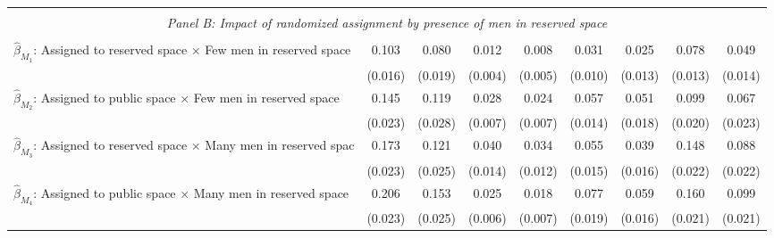 \begin{tabular}{l*{8}{c}}
\hline \\[-1ex] \multicolumn{9}{c}{\textit{Panel B: Impact of randomized assignment by presence of men in reserved space}} \\\\[-1ex]
$\hat\beta_{M_1}$: Assigned to reserved space $\times$ Few men in reserved space&       0.103\sym{***}&       0.080\sym{***}&       0.012\sym{***}&       0.008         &       0.031\sym{***}&       0.025\sym{*}  &       0.078\sym{***}&       0.049\sym{***}\\
                    &     (0.016)         &     (0.019)         &     (0.004)         &     (0.005)         &     (0.010)         &     (0.013)         &     (0.013)         &     (0.014)         \\
[1em]
$\hat\beta_{M_2}$: Assigned to public space $\times$ Few men in reserved space&       0.145\sym{***}&       0.119\sym{***}&       0.028\sym{***}&       0.024\sym{***}&       0.057\sym{***}&       0.051\sym{***}&       0.099\sym{***}&       0.067\sym{***}\\
                    &     (0.023)         &     (0.028)         &     (0.007)         &     (0.007)         &     (0.014)         &     (0.018)         &     (0.020)         &     (0.023)         \\
[1em]
$\hat\beta_{M_3}$: Assigned to reserved space $\times$ Many men in reserved spac&       0.173\sym{***}&       0.121\sym{***}&       0.040\sym{***}&       0.034\sym{***}&       0.055\sym{***}&       0.039\sym{**} &       0.148\sym{***}&       0.088\sym{***}\\
                    &     (0.023)         &     (0.025)         &     (0.014)         &     (0.012)         &     (0.015)         &     (0.016)         &     (0.022)         &     (0.022)         \\
[1em]
$\hat\beta_{M_4}$: Assigned to public space $\times$ Many men in reserved space&       0.206\sym{***}&       0.153\sym{***}&       0.025\sym{***}&       0.018\sym{**} &       0.077\sym{***}&       0.059\sym{***}&       0.160\sym{***}&       0.099\sym{***}\\
                    &     (0.023)         &     (0.025)         &     (0.006)         &     (0.007)         &     (0.019)         &     (0.016)         &     (0.021)         &     (0.021)         \\

\end{tabular}
